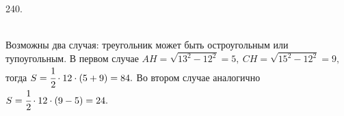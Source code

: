 240. \begin{figure}[ht!]
\end{figure}\\
Возможны два случая: треугольник может быть остроугольным или тупоугольным. В первом случае $AH=\sqrt{13^2-12^2}=5,\ CH=\sqrt{15^2-12^2}=9,$ тогда $S=\cfrac{1}{2}\cdot12\cdot(5+9)=84.$ Во втором случае аналогично $S=\cfrac{1}{2}\cdot12\cdot(9-5)=24.$\newpage\noindent
